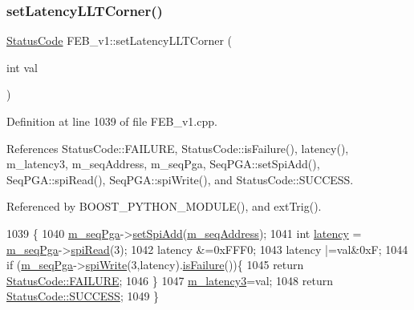 \subsubsection{\texorpdfstring{set\+Latency\+L\+L\+T\+Corner()}{setLatencyLLTCorner()}}
{\footnotesize\ttfamily \hyperlink{classStatusCode}{Status\+Code} F\+E\+B\+\_\+v1\+::set\+Latency\+L\+L\+T\+Corner (\begin{DoxyParamCaption}\item[{int}]{val }\end{DoxyParamCaption})}



Definition at line 1039 of file F\+E\+B\+\_\+v1.\+cpp.



References Status\+Code\+::\+F\+A\+I\+L\+U\+RE, Status\+Code\+::is\+Failure(), latency(), m\+\_\+latency3, m\+\_\+seq\+Address, m\+\_\+seq\+Pga, Seq\+P\+G\+A\+::set\+Spi\+Add(), Seq\+P\+G\+A\+::spi\+Read(), Seq\+P\+G\+A\+::spi\+Write(), and Status\+Code\+::\+S\+U\+C\+C\+E\+SS.



Referenced by B\+O\+O\+S\+T\+\_\+\+P\+Y\+T\+H\+O\+N\+\_\+\+M\+O\+D\+U\+L\+E(), and ext\+Trig().


\begin{DoxyCode}
1039                                              \{
1040   \hyperlink{classFEB__v1_a6c7804ac86796f233a8393043adf2e77}{m\_seqPga}->\hyperlink{classSeqPGA_ac998ce3a6d9b5f2e88cc8393f8c1df53}{setSpiAdd}(\hyperlink{classFEB__v1_a1c1eb093fd1733b9510fcf8bc5c7ad08}{m\_seqAddress});
1041   \textcolor{keywordtype}{int} \hyperlink{classFEB__v1_a68050d232efd8d6568910b09a2c18f62}{latency} = \hyperlink{classFEB__v1_a6c7804ac86796f233a8393043adf2e77}{m\_seqPga}->\hyperlink{classSeqPGA_ab3d0e5e5d4014bc7a92588a76b8713d4}{spiRead}(3);
1042   latency &=0xFFF0;
1043   latency |=val&0xF;
1044    \textcolor{keywordflow}{if} (\hyperlink{classFEB__v1_a6c7804ac86796f233a8393043adf2e77}{m\_seqPga}->\hyperlink{classSeqPGA_ad4421841ce4ce8b88ad13f63216f0743}{spiWrite}(3,latency).\hyperlink{classStatusCode_a5dd22dc6eb2c52fc4cabc58f6dea2eb7}{isFailure}())\{
1045     \textcolor{keywordflow}{return} \hyperlink{classStatusCode_a6f565cbeadc76d14c72f047e5e85eb4ba3da73d4c469762eb9d3c960368252b26}{StatusCode::FAILURE};
1046   \}
1047    \hyperlink{classFEB__v1_a2f71bdcef05c845177a62610da490bf9}{m\_latency3}=val;
1048   \textcolor{keywordflow}{return} \hyperlink{classStatusCode_a6f565cbeadc76d14c72f047e5e85eb4badd0da38d3ba0d922efd1f4619bc37ad8}{StatusCode::SUCCESS};   
1049 \}
\end{DoxyCode}
\mbox{\label{classFEB__v1_a840532b78d0062646116a076e65cf353}} 
